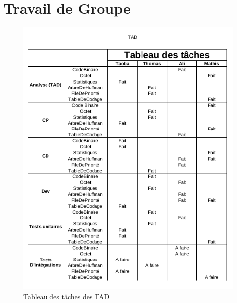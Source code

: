 \documentclass[10pt]{report}
\begin{document}
        \chapter{Travail de Groupe}
        \begin{figure}[h] 
   			 \centering      
    		\includegraphics[width=1.1\textwidth]{TadTableau.png}
    		\caption{Tableau des tâches des TAD}
    		\label{fig:exemple}
		\end{figure}
\end{document}
